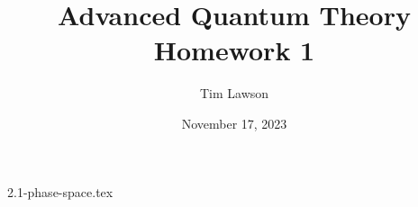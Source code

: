 \documentclass[a4paper]{extarticle}
\title{Advanced Quantum Theory\\
\large Homework 1}
\author{Tim Lawson}
\date{November 17, 2023}
\numberwithin{equation}{subsection}
\begin{document}
\maketitle

\setcounter{section}{2}
{2.1-phase-space.tex}
\end{document}
